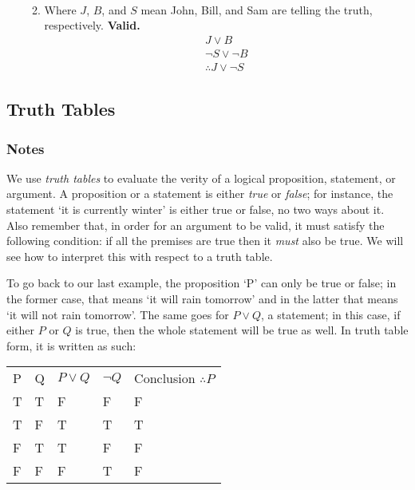\documentclass[a4paper, 11pt]{article}
\begin{document}
\begin{enumerate}
\begin{enumerate}
\begin{align*}
                \end{align*}
          \item Where $J$, $B$, and $S$ mean John, Bill, and Sam are telling the truth, respectively. \textbf{Valid.}
                \begin{align*}
                  J \vee B \\  \neg S \vee \neg B \\ \therefore J \vee \neg S
                \end{align*}
        \end{enumerate}
\end{enumerate}

\clearpage

\subsection{Truth Tables}
\subsubsection{Notes}
We use \textit{truth tables} to evaluate the verity of a logical proposition, statement, or argument. A proposition or a statement is either \textit{true} or \textit{false}; for instance, the statement `it is currently winter' is either true or false, no two ways about it. Also remember that, in order for an argument to be valid, it must satisfy the following condition: if all the premises are true then it \textit{must} also be true. We will see how to interpret this with respect to a truth table.

To go back to our last example, the proposition `P' can only be true or false; in the former case, that means `it will rain tomorrow' and in the latter that means `it will not rain tomorrow'. The same goes for $P \vee Q$, a statement; in this case, if either $P$ or $Q$ is true, then the whole statement will be true as well.  In truth table form, it is written as such:

\begin{table}[htbp]
  \centering
  \begin{tabular}{lllll}
    P & Q & $P \vee Q$ & $\neg Q$ & Conclusion  $\therefore P$ \\
    T & T & F          & F        & F                          \\
    T & F & T          & T        & T                          \\
    F & T & T          & F        & F                          \\
    F & F & F          & T        & F                          \\
  \end{tabular}
\end{table}
\end{document}
